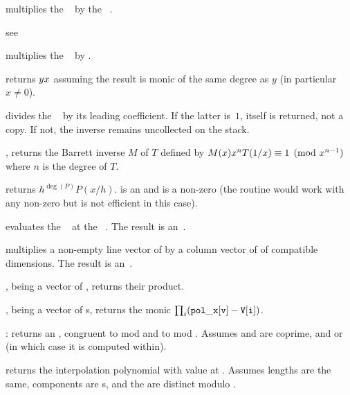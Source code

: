  multiplies the ~
by the ~.

 see 

 multiplies the ~
by .

 returns $y\*x$ assuming the
result is monic of the same degree as $y$ (in particular $x\neq 0$).


 divides the ~ by its
leading coefficient. If the latter is~$1$,  itself is returned, not a
copy. If not, the inverse remains uncollected on the stack.

, returns the Barrett inverse
$M$ of $T$ defined by $M(x)\*x^n\*T(1/x)\equiv 1\pmod{x^{n-1}}$ where $n$ is
the degree of $T$.

 returns $h^{\deg(P)} P(x/h)$.
 is an  and  is a non-zero  (the routine would
work with any non-zero  but is not efficient in this case).

 evaluates the ~
at the ~. The result is an~.

 multiplies a non-empty line
vector of by a column vector of  of compatible dimensions.
The result is an~.

,  being a vector of ,
returns their product.

,  being a vector
of s, returns the monic 
$\prod_i ({\tt pol\_x[v]} - {\tt V[i]})$.

:
returns an , congruent to  mod  and to  mod
. Assumes  and  are coprime, and 
or  (in which case it is computed within).

 returns the 
interpolation polynomial with value  at . Assumes lengths
are the same, components are s, and the  are distinct
modulo .

